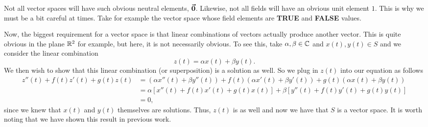 \documentclass[12pt]{article} %
\begin{document}
\begin{solution}
    \begin{remark}
        Not all vector spaces will have such obvious neutral elements, $\boldsymbol{\vec{0}}$. Likewise, not all fields will have an obvious unit element $1$.  This is why we must be a bit careful at times. Take for example the vector space whose field elements are \textbf{TRUE} and \textbf{FALSE} values.
    \end{remark}
    Now, the biggest requirement for a vector space is that linear combinations of vectors actually produce another vector. This is quite obvious in the plane $\mathbb{R}^2$ for example, but here, it is not necessarily obvious. To see this, take $\alpha,\beta \in \mathbb{C}$ and $x(t),y(t)\in S$ and we consider the linear combination
    \[
    z(t) = \alpha x(t) + \beta y(t).
    \]
    We then wish to show that this linear combination (or superposition) is a solution as well. So we plug in $z(t)$ into our equation as follows
    \begin{align*}
        z''(t)+f(t)z'(t)+g(t)z(t)&= (\alpha x''(t) + \beta y''(t))+f(t)(\alpha x'(t) + \beta y'(t))+g(t)(\alpha x(t)+\beta y(t))\\
        &= \alpha \left[x''(t)+f(t)x'(t)+g(t)x(t)\right] + \beta \left[ y''(t)+f(t)y'(t)+g(t)y(t)\right]\\
        &=0,
    \end{align*}
    since we knew that $x(t)$ and $y(t)$ themselves are solutions. Thus, $z(t)$ is as well and now we have that $S$ is a vector space. It is worth noting that we have shown this result in previous work.
\end{solution}
\end{document}
